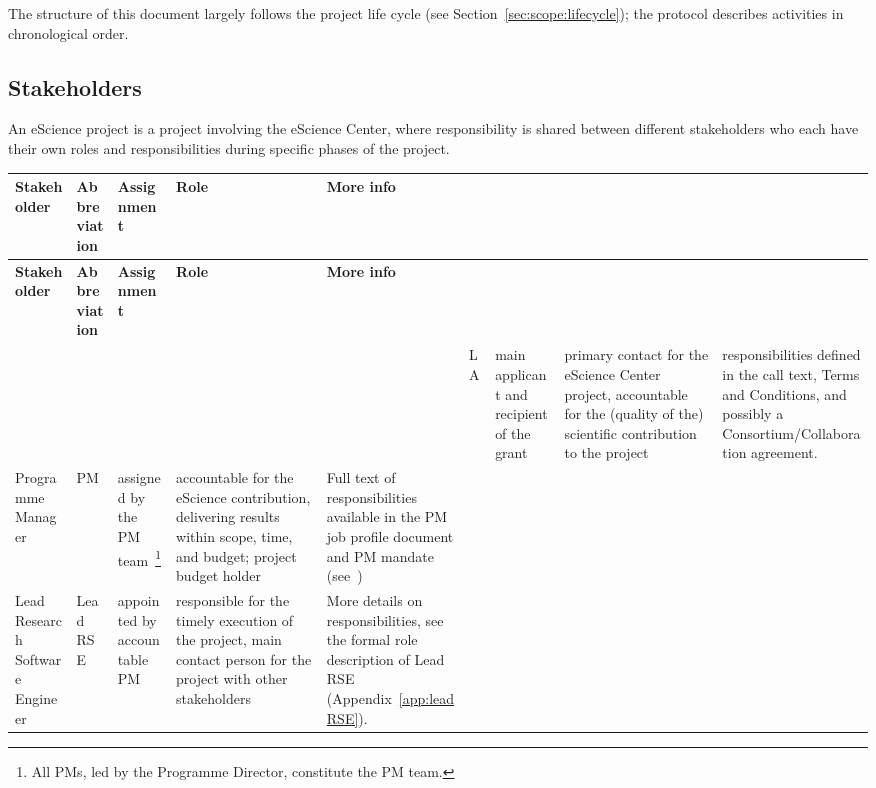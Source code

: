 The structure of this document largely follows the project life cycle (see Section~\ref{sec:scope:lifecycle}); the
protocol describes activities in chronological order.

\subsection{Stakeholders}
An eScience project is a project involving the eScience Center, where responsibility is shared between different
stakeholders who each have their own roles and responsibilities during specific phases of the project.


\begin{tabularx}{\linewidth}{p{}|p{}|p{}|p{}|p{}}
\toprule
\textbf{Stakeholder} & \textbf{Abbreviation} & \textbf{Assignment}& \textbf{Role}& \textbf{More info}\\
\midrule
\endfirsthead
\toprule
\textbf{Stakeholder} & \textbf{Abbreviation} & \textbf{Assignment}& \textbf{Role}& \textbf{More info}\\
\toprule
\endhead
\midrule
\multicolumn{5}{r}{}
\endfoot
\bottomrule
\endlastfoot  
Lead Applicant & LA & main applicant and recipient of the grant & primary contact for the eScience Center project, accountable for the (quality of the) scientific contribution to the project & responsibilities defined in the call text, Terms and Conditions, and possibly a Consortium/Collaboration agreement.  \\\hline
Programme Manager                                  & PM                    & assigned by the PM team~\footnote{All PMs, led by the Programme Director, constitute the PM team.}                                                                                          & accountable for the eScience contribution, delivering results within scope, time, and budget; project budget holder                                                              & Full text of responsibilities available in the PM job profile document and PM mandate (see~\cite{intranet})  \\\hline
Lead Research Software Engineer                    & Lead RSE              & appointed by accountable PM                                                                                       & responsible for the timely execution of the project, main contact person for the project with other stakeholders                                                                                                                       & More details on responsibilities, see the formal role description of Lead RSE (Appendix~\ref{app:leadRSE}).                          \\\hline

\end{tabularx}
